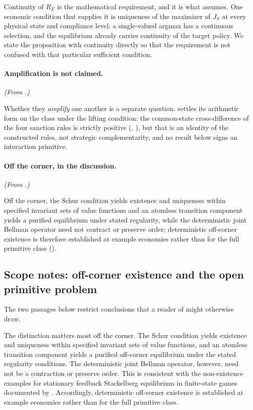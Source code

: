 Continuity of $R_E$ is the mathematical requirement, and it is what
 assumes. One economic condition that supplies it is
uniqueness of the maximizer of $J_S$ at every physical
state and compliance level: a single-valued argmax has a continuous selection, and
the equilibrium already carries continuity of the target policy. We state the
proposition with continuity directly so that the requirement is not confused with
that particular sufficient condition.

\paragraph{Amplification is not claimed.} \emph{(From .)}

Whether they \emph{amplify} one another is a separate question.
 settles its arithmetic form on the class under the lifting condition: the
common-state cross-difference of the four sanction rules is
strictly positive (,
), but that is an identity of the constructed
rules, not strategic complementarity, and no result below signs an
interaction primitive.

\paragraph{Off the corner, in the discussion.} \emph{(From .)}

Off the corner, the Schur condition yields existence and uniqueness within
specified invariant sets of value functions and an atomless transition component yields a purified
equilibrium under stated regularity, while the deterministic joint Bellman
operator need not contract or preserve order; deterministic off-corner
existence is therefore established at example economies rather than
for the full primitive class ().

\subsection{Scope notes: off-corner existence and the open primitive problem}
\label{app:scope-notes}

The two passages below restrict conclusions that a reader of
 might otherwise draw.

The distinction matters most off the corner. The Schur condition yields
existence and uniqueness within specified invariant sets of value functions, and an atomless
transition component yields a purified off-corner equilibrium under the
stated regularity conditions. The deterministic joint Bellman operator,
however, need not be a contraction or preserve order. This is consistent
with the non-existence examples for stationary feedback Stackelberg
equilibrium in finite-state games documented by \citet{Bucarey2023}.
Accordingly, deterministic off-corner existence is established at
example economies rather than for the full primitive class.

